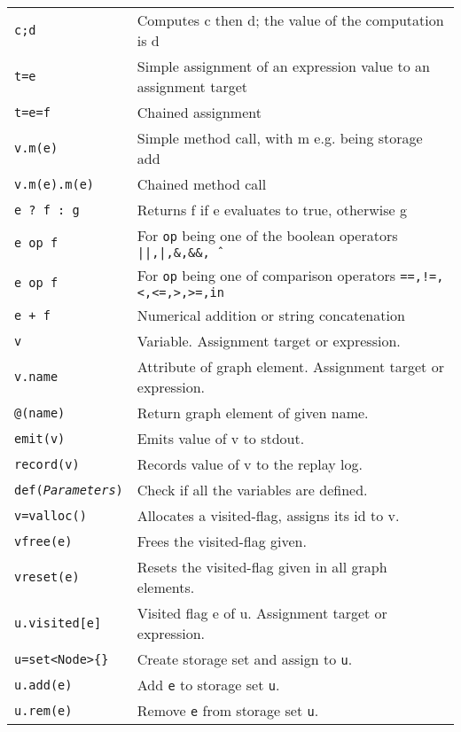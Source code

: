 \begin{table}[htbp]
\begin{minipage}{\linewidth} \renewcommand{\footnoterule}{} 
\begin{tabularx}{\linewidth}{|lX|}
\hline
\texttt{c;d}	& Computes c then d; the value of the computation is d\\
\texttt{t=e}	& Simple assignment of an expression value to an assignment target\\
\texttt{t=e=f}	& Chained assignment \\
\texttt{v.m(e)}	& Simple method call, with m e.g. being storage add \\
\texttt{v.m(e).m(e)}	& Chained method call\\
\hline
\texttt{e ? f : g}	& Returns f if e evaluates to true, otherwise g \\
\texttt{e op f}	& For \texttt{op} being one of the boolean operators \texttt{||,|,\&,\&\&,\^\ } \\
\texttt{e op f}	& For \texttt{op} being one of comparison operators \texttt{==,!=,<,<=,>,>=,in} \\
\texttt{e + f}	& Numerical addition or string concatenation \\
\hline
\texttt{v} & Variable. Assignment target or expression.\\
\texttt{v.name} & Attribute of graph element. Assignment target or expression.\\
\texttt{@(name)} & Return graph element of given name.\\
\texttt{emit(v)} & Emits value of v to stdout.\\
\texttt{record(v)} & Records value of v to the replay log.\\
\texttt{def(\emph{Parameters})} & Check if all the variables are defined.\\
\hline
\texttt{v=valloc()} & Allocates a visited-flag, assigns its id to v.\\
\texttt{vfree(e)} & Frees the visited-flag given.\\
\texttt{vreset(e)} & Resets the visited-flag given in all graph elements.\\
\texttt{u.visited[e]} & Visited flag e of u. Assignment target or expression.\\
\hline
\texttt{u=set<Node>\{\}}	& Create storage set and assign to \texttt{u}.\\
\texttt{u.add(e)}	& Add \texttt{e} to storage set \texttt{u}.\\
\texttt{u.rem(e)}	& Remove \texttt{e} from storage set \texttt{u}.\\

\end{tabularx}
\end{minipage}
\end{table}
